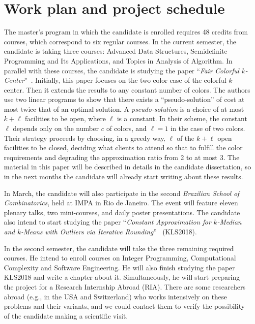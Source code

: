 \documentclass[12pt]{article}
\begin{document}
\section{Work plan and project schedule}

The master's program in which the candidate is enrolled requires 48 credits from courses, which correspond to six regular courses. 
In the current semester, the candidate is taking three courses: Advanced Data Structures, Semidefinite Programming and Its Applications, and Topics in Analysis of Algorithm. 
In parallel with these courses, the candidate is studying the paper ``\emph{Fair Colorful $k$-Center}''~\cite{JSS2020}. 
Initially, this paper focuses on the two-color case of the colorful $k$-center. 
Then it extends the results to any constant number of colors. 
The authors use two linear programs to show that there exists a ``pseudo-solution'' of cost at most twice that of an optimal solution. 
A \emph{pseudo-solution} is a choice of at most $k + \ell$ facilities to be open, where $\ell$ is a constant. In their scheme, the constant $\ell$ depends only on the number $c$ of colors, and $\ell = 1$ in the case of two colors.
Their strategy proceeds by choosing, in a greedy way, $\ell$ of the $k+\ell$ open facilities to be closed, deciding what clients to attend so that to fulfill the color requirements and degrading the approximation ratio from 2 to at most 3.
The material in this paper will be described in details in the candidate dissertation, so in the next months the candidate will already start writing about these results.

In March, the candidate will also participate in the second \emph{Brazilian School of Combinatorics}, held at IMPA in Rio de Janeiro. 
The event will feature eleven plenary talks, two mini-courses, and daily poster presentations. 
The candidate also intend to start studying the paper ``\emph{Constant Approximation for $k$-Median and $k$-Means with Outliers
via Iterative Rounding}''~\cite{KLS2018} (KLS2018).

In the second semester, the candidate will take the three remaining required courses.
He intend to enroll courses on Integer Programming, Computational Complexity and Software Engineering. 
He will also finish studying the paper KLS2018 and write a chapter about it.
Simultaneously, he will start preparing the project for a Research Internship Abroad (RIA). 
There are some researchers abroad (e.g., in the USA and Switzerland) who works intensively on these problems and their variants, and we could contact them to verify the possibility of the candidate making a scientific visit.
\end{document}
